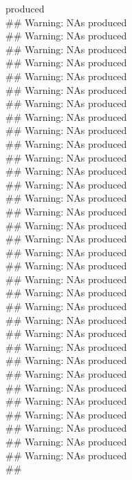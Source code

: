 \documentclass{article}\usepackage[]{graphicx}\usepackage[]{color}
\makeatletter
\newenvironment{kframe}{%
 \def\at@end@of@kframe{}%
 \ifinner\ifhmode%
  \def\at@end@of@kframe{\end{minipage}}%
  \begin{minipage}{\columnwidth}%
 \fi\fi%
 \def\FrameCommand##1{\hskip\@totalleftmargin \hskip-\fboxsep
 \colorbox{shadecolor}{##1}\hskip-\fboxsep
     \hskip-\linewidth \hskip-\@totalleftmargin \hskip\columnwidth}%
 \MakeFramed {\advance\hsize-\width
   \@totalleftmargin\z@ \linewidth\hsize
   \@setminipage}}%
 {\par\unskip\endMakeFramed%
 \at@end@of@kframe}
\newenvironment{knitrout}{}{} %
\makeatother
\begin{document}
\begin{knitrout}
\begin{kframe}
produced\\\#\# Warning: NAs produced\\\#\# Warning: NAs produced\\\#\# Warning: NAs produced\\\#\# Warning: NAs produced\\\#\# Warning: NAs produced\\\#\# Warning: NAs produced\\\#\# Warning: NAs produced\\\#\# Warning: NAs produced\\\#\# Warning: NAs produced\\\#\# Warning: NAs produced\\\#\# Warning: NAs produced\\\#\# Warning: NAs produced\\\#\# Warning: NAs produced\\\#\# Warning: NAs produced\\\#\# Warning: NAs produced\\\#\# Warning: NAs produced\\\#\# Warning: NAs produced\\\#\# Warning: NAs produced\\\#\# Warning: NAs produced\\\#\# Warning: NAs produced\\\#\# Warning: NAs produced\\\#\# Warning: NAs produced\\\#\# Warning: NAs produced\\\#\# Warning: NAs produced\\\#\# Warning: NAs produced\\\#\# Warning: NAs produced\\\#\# Warning: NAs produced\\\#\# Warning: NAs produced\\\#\# Warning: NAs produced\\\#\# Warning: NAs produced\\\#\# Warning: NAs produced\\\#\# Warning: NAs produced\\\#\# Warning: NAs produced\\\#\# 
\end{kframe}
\end{knitrout}
\end{document}
